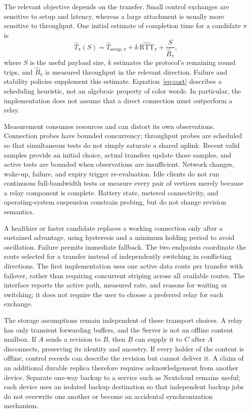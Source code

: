 \documentclass[11pt,a4paper]{article}
\theoremstyle{definition}
\theoremstyle{plain}
\begin{document}
The relevant objective depends on the transfer. Small control exchanges
are sensitive to setup and latency, whereas a large attachment is
usually more sensitive to throughput. One initial estimate of completion
time for a candidate $\pi$ is
\begin{equation}
 \widehat T_\pi(S)=\widehat T_{\mathrm{setup},\pi}
       +k\,\widehat{\mathrm{RTT}}_\pi+\frac{S}{\widehat B_\pi},
 \label{eq:cost}
\end{equation}
where $S$ is the useful payload size, $k$ estimates the protocol's
remaining round trips, and $\widehat B_\pi$ is measured throughput in
the relevant direction. Failure and stability policies supplement this
estimate. Equation~\eqref{eq:cost} describes a scheduling heuristic,
not an algebraic property of color words. In particular, the implementation
does not assume that a direct connection must outperform a relay.

Measurement consumes resources and can distort its own observations.
Connection probes have bounded concurrency; throughput probes are
scheduled so that simultaneous tests do not simply saturate a shared
uplink. Recent valid samples provide an initial choice, actual transfers
update those samples, and active tests are bounded when observations
are insufficient. Network changes, wake-up, failure, and expiry trigger
re-evaluation. Idle clients do not run continuous full-bandwidth tests
or measure every pair of vertices merely because a relay component is
complete. Battery state, metered connectivity, and operating-system
suspension constrain probing, but do not change revision semantics.

A healthier or faster candidate replaces a working connection only
after a sustained advantage, using hysteresis and a minimum holding
period to avoid oscillation. Failure permits immediate fallback.
The two endpoints coordinate the route selected for a transfer instead
of independently switching in conflicting directions. The first
implementation uses one active data route per transfer with failover,
rather than requiring concurrent striping across all available routes.
The interface reports the active path, measured rate, and reasons for
waiting or switching; it does not require the user to choose a preferred
relay for each exchange.

The storage assumptions remain independent of these transport choices.
A relay has only transient forwarding buffers, and the Server is not
an offline content mailbox. If $A$ sends a revision to $B$, then $B$
can supply it to $C$ after $A$ disconnects, preserving its identity and
ancestry. If every holder of the content is offline, control records
can describe the revision but cannot deliver it. A claim of an additional
durable replica therefore requires acknowledgement from another device.
Separate one-way backup to a service such as Nextcloud remains useful;
each device uses an isolated backup destination so that independent
backup jobs do not overwrite one another or become an accidental
synchronization mechanism.
\end{document}
